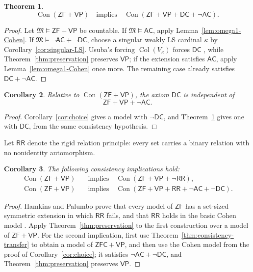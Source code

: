 \documentclass[11pt,a4paper]{amsart}
\newcommand{\VP}{\mathsf{VP}}
\newcommand{\AC}{\mathsf{AC}}
\newcommand{\ZF}{\mathsf{ZF}}
\newcommand{\ZFC}{\mathsf{ZFC}}
\newcommand{\Con}{\operatorname{Con}}
\newcommand{\Col}{\operatorname{Col}}
\newcommand{\DC}{\mathsf{DC}}
\newcommand{\RR}{\mathsf{RR}}
\theoremstyle{plain}
\newtheorem{theorem}{Theorem}[section]
\newtheorem{corollary}[theorem]{Corollary}
\theoremstyle{definition}
\theoremstyle{remark}
\begin{document}
\begin{theorem}\label{thm:DC-notAC}
\[
\Con(\ZF+\VP)\quad\text{implies}\quad
\Con(\ZF+\VP+\DC+\neg\AC).
\]
\end{theorem}

\begin{proof}

Let $\mathfrak M\models\ZF+\VP$ be countable.  If $\mathfrak M\models\AC$, apply Lemma~\ref{lem:omega1-Cohen}.  If $\mathfrak M\models\neg\AC+\neg\DC$, choose a singular weakly LS cardinal $\kappa$ by Corollary~\ref{cor:singular-LS}.  Usuba's forcing $\Col(V_\kappa)$ forces $\DC$ \cite[Proposition~3.6]{Usuba}, while Theorem~\ref{thm:preservation} preserves $\VP$; if the extension satisfies $\AC$, apply Lemma~\ref{lem:omega1-Cohen} once more.  The remaining case already satisfies $\DC+\neg\AC$.
\end{proof}

\begin{corollary}\label{cor:DC-independent}
Relative to $\Con(\ZF+\VP)$, the axiom $\DC$ is independent of
\[
\ZF+\VP+\neg\AC.
\]
\end{corollary}

\begin{proof}
Corollary~\ref{cor:choice} gives a model with $\neg\DC$, and Theorem~\ref{thm:DC-notAC} gives one with $\DC$, from the same consistency hypothesis.
\end{proof}

Let $\RR$ denote the rigid relation principle: every set carries a binary relation with no nonidentity automorphism.

\begin{corollary}\label{cor:RR}
The following consistency implications hold:
\[
\begin{aligned}
\Con(\ZF+\VP)&\quad\text{implies}\quad\Con(\ZF+\VP+\neg\RR),\\
\Con(\ZF+\VP)&\quad\text{implies}\quad
\Con(\ZF+\VP+\RR+\neg\AC+\neg\DC).
\end{aligned}
\]
\end{corollary}

\begin{proof}
Hamkins and Palumbo prove that every model of $\ZF$ has a set-sized symmetric extension in which $\RR$ fails, and that $\RR$ holds in the basic Cohen model \cite[Theorems~5 and~6]{HamkinsPalumbo}.  Apply Theorem~\ref{thm:preservation} to the first construction over a model of $\ZF+\VP$.  For the second implication, first use Theorem~\ref{thm:consistency-transfer} to obtain a model of $\ZFC+\VP$, and then use the Cohen model from the proof of Corollary~\ref{cor:choice}; it satisfies $\neg\AC+\neg\DC$, and Theorem~\ref{thm:preservation} preserves $\VP$.
\end{proof}
\endgroup
\end{document}
